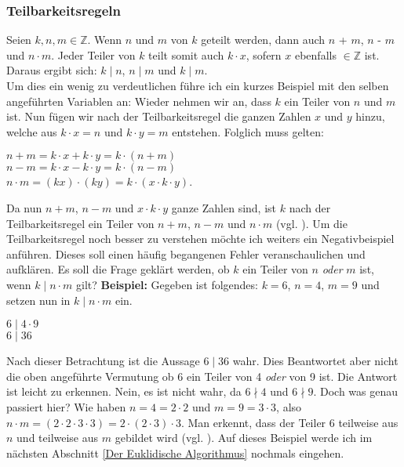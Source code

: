 \documentclass[12pt,a4paper]{article}
\theoremstyle{definition}
\begin{document}
\subsubsection{Teilbarkeitsregeln}\label{Teilbarkeitsregeln}
Seien $k, n, m \in \mathbb{Z}$.
Wenn $n$ und $m$ von $k$ geteilt werden, dann auch $n$ + $m$,\newline
$n$ - $m$ und $n\cdot m$. Jeder Teiler von $k$ teilt somit auch $k \cdot x$, sofern $x$ ebenfalls $\in \mathbb{Z}$ ist.
Daraus ergibt sich: $k \mid n$, $n \mid m$ und $k \mid m$.\\
Um dies ein wenig zu verdeutlichen führe ich ein kurzes Beispiel mit den selben angeführten Variablen an:
Wieder nehmen wir an, dass $k$ ein Teiler von $n$ und $m$ ist.
Nun fügen wir nach der Teilbarkeitsregel die ganzen Zahlen $x$ und $y$ hinzu, welche aus $k \cdot x = n$ und $k \cdot y = m$ entstehen.
Folglich muss gelten:
\begin{center}
$n + m = k \cdot x + k \cdot y = k \cdot (n + m)$\\
$n - m = k \cdot x - k \cdot y = k \cdot (n - m)$\\
$n \cdot m = (kx) \cdot (ky) = k \cdot (x \cdot k \cdot y)$.
\end{center}
Da nun $n + m$, $n - m$ und $x \cdot k \cdot y$ ganze Zahlen sind, ist $k$ nach der Teilbarkeitsregel ein Teiler von $n + m$, $n - m$ und $n \cdot m$ (vgl. \cite[13--15]{RempeGillen2009}).\newline
Um die Teilbarkeitsregel noch besser zu verstehen möchte ich weiters ein Negativbeispiel \label{Negativbeispiel} anführen.
Dieses soll einen häufig begangenen Fehler veranschaulichen und aufklären.
Es soll die Frage geklärt werden, ob $k$ ein Teiler von $n$ \textit{oder} $m$ ist, wenn $k \mid n \cdot m$ gilt?\newline
\textbf{Beispiel:} Gegeben ist folgendes: $k = 6$, $n = 4$, $m = 9$ und setzen nun in $k \mid n \cdot m$ ein.
\begin{center}
$6 \mid 4 \cdot 9$\\
$6 \mid 36$
\end{center}
Nach dieser Betrachtung ist die Aussage $6 \mid 36$ wahr.
Dies Beantwortet aber nicht die oben angeführte Vermutung ob 6 ein Teiler von 4 \textit{oder} von 9 ist.
Die Antwort ist leicht zu erkennen.
Nein, es ist nicht wahr, da $6 \nmid 4$ und $6 \nmid 9$.\newline
Doch was genau passiert hier? Wie haben $n = 4 = 2 \cdot 2$ und $m = 9 = 3 \cdot 3$, also $n \cdot m = (2 \cdot 2 \cdot 3 \cdot 3) = 2 \cdot (2 \cdot 3) \cdot 3$.
Man erkennt, dass der Teiler 6 teilweise aus $n$ und teilweise aus $m$ gebildet wird (vgl. \cite[235]{Houston2012}). Auf dieses Beispiel werde ich im nächsten Abschnitt \ref{Der Euklidische Algorithmus} nochmals eingehen.
\end{document}
